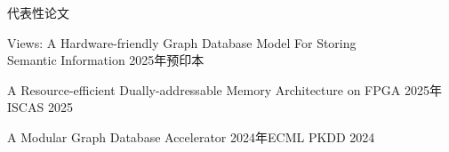 \documentclass{resume}
\begin{document}
\begin{rSection}{代表性论文}
  \begin{rSubsectionNoItems}{Views: A Hardware-friendly Graph Database Model For Storing\\Semantic Information}
    {2025年}{预印本}{ }
  \end{rSubsectionNoItems}
  \begin{rSubsectionNoItems}{A Resource-efficient Dually-addressable Memory Architecture on FPGA}
    {2025年}{ISCAS 2025}{}
  \end{rSubsectionNoItems}
  \begin{rSubsectionNoItems}{A Modular Graph Database Accelerator}
    {2024年}{ECML PKDD 2024}{}
  \end{rSubsectionNoItems}
\end{rSection}
\end{document}
